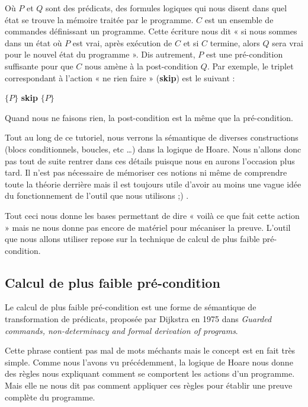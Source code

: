 \documentclass[12pt,francais,]{scrbook}
\begin{document}
Où \(P\) et \(Q\) sont des prédicats, des formules logiques qui nous
disent dans quel état se trouve la mémoire traitée par le programme.
\(C\) est un ensemble de commandes définissant un programme. Cette
écriture nous dit « si nous sommes dans un état où \(P\) est vrai, après
exécution de \(C\) et si \(C\) termine, alors \(Q\) sera vrai pour le
nouvel état du programme ». Dis autrement, \(P\) est une pré-condition
suffisante pour que \(C\) nous amène à la post-condition \(Q\). Par
exemple, le triplet correspondant à l'action « ne rien faire »
(\textbf{skip}) est le suivant :

\begin{center} \(\{P\}\) \textbf{skip} \(\{P\}\) \end{center}

Quand nous ne faisons rien, la post-condition est la même que la
pré-condition.

Tout au long de ce tutoriel, nous verrons la sémantique de diverses
constructions (blocs conditionnels, boucles, etc \ldots{}) dans la
logique de Hoare. Nous n'allons donc pas tout de suite rentrer dans
ces détails puisque nous en aurons l'occasion plus tard. Il n'est pas
nécessaire de mémoriser ces notions ni même de comprendre toute la
théorie derrière mais il est toujours utile d'avoir au moins une vague
idée du fonctionnement de l'outil que nous utilisons ;) .


Tout ceci nous donne les bases permettant de dire « voilà ce que fait
cette action » mais ne nous donne pas encore de matériel pour mécaniser
la preuve. L'outil que nous allons utiliser repose sur la technique de
calcul de plus faible pré-condition.

\subsection{Calcul de plus faible
pré-condition}\label{calcul-de-plus-faible-pruxe9-condition}

Le calcul de plus faible pré-condition est une forme de sémantique de
transformation de prédicats, proposée par Dijkstra en 1975 dans
\emph{Guarded commands, non-determinacy and formal derivation of
programs}.

Cette phrase contient pas mal de mots méchants mais le concept est en
fait très simple. Comme nous l'avons vu précédemment, la logique de
Hoare nous donne des règles nous expliquant comment se comportent les
actions d'un programme. Mais elle ne nous dit pas comment appliquer ces
règles pour établir une preuve complète du programme.
\end{document}
